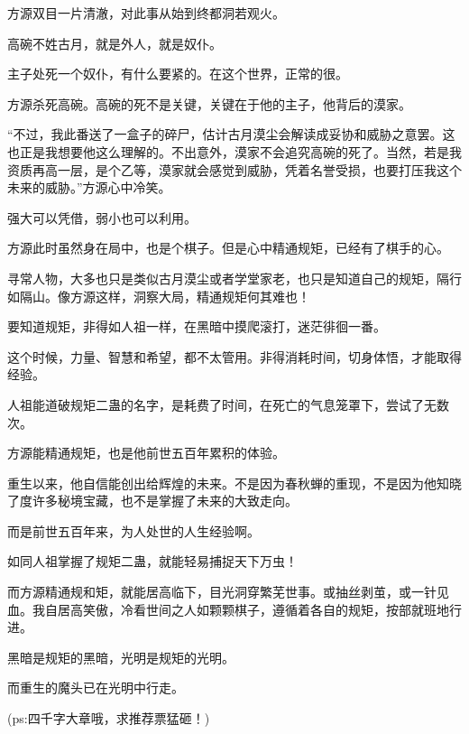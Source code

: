 \begin{this_body}
方源双目一片清澈，对此事从始到终都洞若观火。

高碗不姓古月，就是外人，就是奴仆。

主子处死一个奴仆，有什么要紧的。在这个世界，正常的很。

方源杀死高碗。高碗的死不是关键，关键在于他的主子，他背后的漠家。

“不过，我此番送了一盒子的碎尸，估计古月漠尘会解读成妥协和威胁之意罢。这也正是我想要他这么理解的。不出意外，漠家不会追究高碗的死了。当然，若是我资质再高一层，是个乙等，漠家就会感觉到威胁，凭着名誉受损，也要打压我这个未来的威胁。”方源心中冷笑。

强大可以凭借，弱小也可以利用。

方源此时虽然身在局中，也是个棋子。但是心中精通规矩，已经有了棋手的心。

寻常人物，大多也只是类似古月漠尘或者学堂家老，也只是知道自己的规矩，隔行如隔山。像方源这样，洞察大局，精通规矩何其难也！

要知道规矩，非得如人祖一样，在黑暗中摸爬滚打，迷茫徘徊一番。

这个时候，力量、智慧和希望，都不太管用。非得消耗时间，切身体悟，才能取得经验。

人祖能道破规矩二蛊的名字，是耗费了时间，在死亡的气息笼罩下，尝试了无数次。

方源能精通规矩，也是他前世五百年累积的体验。

重生以来，他自信能创出给辉煌的未来。不是因为春秋蝉的重现，不是因为他知晓了度许多秘境宝藏，也不是掌握了未来的大致走向。

而是前世五百年来，为人处世的人生经验啊。

如同人祖掌握了规矩二蛊，就能轻易捕捉天下万虫！

而方源精通规和矩，就能居高临下，目光洞穿繁芜世事。或抽丝剥茧，或一针见血。我自居高笑傲，冷看世间之人如颗颗棋子，遵循着各自的规矩，按部就班地行进。

黑暗是规矩的黑暗，光明是规矩的光明。

而重生的魔头已在光明中行走。

(ps:四千字大章哦，求推荐票猛砸！)

\end{this_body}


